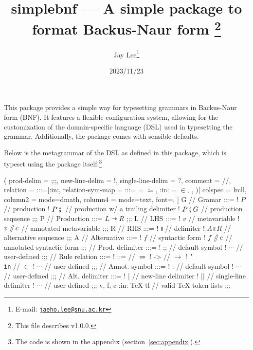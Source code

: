 \documentclass[11pt]{article}
\title{%
  \textsf{simplebnf} --- A simple package to format Backus-Naur form%
  \footnote{This file describes v1.0.0.}}
\author{Jay Lee\footnote{E-mail: %
  \href{mailto:jaeho.lee@snu.ac.kr}{\texttt{jaeho.lee@snu.ac.kr}}}}
\date{2023/11/23}
\begin{document}
\maketitle


\vfill
This package provides a simple way for typesetting grammars in Backus-Naur form (BNF).
It features a flexible configuration system, allowing for the customization of the domain-specific language (DSL) used in typesetting the grammar.
Additionally, the package comes with sensible defaults.

Below is the metagrammar of the DSL as defined in this package, which is typeset using the package itself.\footnote{The code is shown in the appendix (section~\ref{sec:appendix}).}
\begin{tcolorbox}
  \begin{center}
    \begin{bnf}(
      prod-delim = ;;;,
      new-line-delim = !,
      single-line-delim = ?,
      comment = //,
      relation = {:::=|:in:},
      relation-sym-map =
        {
          {:::=} = $\Coloneqq$,
          {:in:} = $\in$,
        },
    )[
      colspec = lrcll,
      column{2} = {mode=dmath},
      column{4} = {mode=text, font=\ttfamily},
    ]
      G // Gramar :::=
      ! $P$ // production
      ! $P \fatsemi {}$ // production w/ a trailing delimiter
      ! $P \fatsemi G$ // production sequence
    ;;;
      P // Production :::= $L \rightarrowtriangle R$
    ;;;
      L // LHS :::=
      ! $v$ // metavariable
      ! $v\!\fatslash\,c$ // annotated metavariable
    ;;;
      R // RHS :::=
      ! $\talloblong$ // delimiter
      ! $A \talloblong R$ // alternative sequence
    ;;;
      A // Alternative :::=
      ! $f$ // syntactic form
      ! $f\!\fatslash\,c$ // annotated syntactic form
    ;;;
      \fatsemi // Prod. delimiter :::=
      ! ;; // default symbol
      ! $\cdots$ // user-defined
    ;;;
      \rightarrowtriangle // Rule relation :::=
      ! ::= // $\Coloneqq$
      ! -> // $\to$
      ! \texttt{\char`\\in} // $\in$
      ! $\cdots$ // user-defined
    ;;;
      \fatslash // Annot. symbol :::=
      ! : // default symbol
      ! $\cdots$ // user-defined
    ;;;
      \talloblong // Alt. delimiter :::=
      ! | // new-line delimiter
      ! || // single-line delimiter
      ! $\cdots$ // user-defined
    ;;;
      v, f, c :in: \textsf{\TeX{} tl} // valid \TeX{} token lists
    ;;;
    \end{bnf}
  \end{center}
\end{tcolorbox}
\vfill
\end{document}
